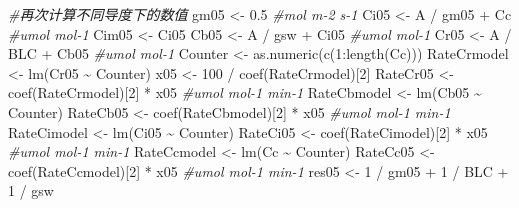 \documentclass[
]{krantz}
\makeatletter
\newenvironment{Shaded}{\begin{snugshade}}{\end{snugshade}}
\newcommand{\CommentTok}[1]{\textcolor[rgb]{0.56,0.35,0.01}{\textit{#1}}}
\newcommand{\DecValTok}[1]{\textcolor[rgb]{0.00,0.00,0.81}{#1}}
\newcommand{\FloatTok}[1]{\textcolor[rgb]{0.00,0.00,0.81}{#1}}
\newcommand{\FunctionTok}[1]{\textcolor[rgb]{0.00,0.00,0.00}{#1}}
\newcommand{\NormalTok}[1]{#1}
\newcommand{\OtherTok}[1]{\textcolor[rgb]{0.56,0.35,0.01}{#1}}
\newcommand{\SpecialCharTok}[1]{\textcolor[rgb]{0.00,0.00,0.00}{#1}}
\newenvironment{kframe}{%
\medskip{}
\setlength{\fboxsep}{.8em}
 \def\at@end@of@kframe{}%
 \ifinner\ifhmode%
  \def\at@end@of@kframe{\end{minipage}}%
  \begin{minipage}{\columnwidth}%
 \fi\fi%
 \def\FrameCommand##1{\hskip\@totalleftmargin \hskip-\fboxsep
 \colorbox{shadecolor}{##1}\hskip-\fboxsep
     \hskip-\linewidth \hskip-\@totalleftmargin \hskip\columnwidth}%
 \MakeFramed {\advance\hsize-\width
   \@totalleftmargin\z@ \linewidth\hsize
   \@setminipage}}%
 {\par\unskip\endMakeFramed%
 \at@end@of@kframe}
\renewenvironment{Shaded}{\begin{kframe}}{\end{kframe}}
\makeatother
\begin{document}
\begin{Shaded}
\begin{Highlighting}[]
\CommentTok{\#再次计算不同导度下的数值}
\NormalTok{gm05 }\OtherTok{\textless{}{-}} \FloatTok{0.5} \CommentTok{\#mol m{-}2 s{-}1}
\NormalTok{Ci05 }\OtherTok{\textless{}{-}}\NormalTok{ A }\SpecialCharTok{/}\NormalTok{ gm05 }\SpecialCharTok{+}\NormalTok{ Cc }\CommentTok{\#umol mol{-}1}
\NormalTok{Cim05 }\OtherTok{\textless{}{-}}\NormalTok{ Ci05}
\NormalTok{Cb05 }\OtherTok{\textless{}{-}}\NormalTok{ A }\SpecialCharTok{/}\NormalTok{ gsw }\SpecialCharTok{+}\NormalTok{ Ci05 }\CommentTok{\#umol mol{-}1}
\NormalTok{Cr05 }\OtherTok{\textless{}{-}}\NormalTok{ A }\SpecialCharTok{/}\NormalTok{ BLC }\SpecialCharTok{+}\NormalTok{ Cb05 }\CommentTok{\#umol mol{-}1}
\NormalTok{Counter }\OtherTok{\textless{}{-}} \FunctionTok{as.numeric}\NormalTok{(}\FunctionTok{c}\NormalTok{(}\DecValTok{1}\SpecialCharTok{:}\FunctionTok{length}\NormalTok{(Cc)))}
\NormalTok{RateCrmodel }\OtherTok{\textless{}{-}} \FunctionTok{lm}\NormalTok{(Cr05 }\SpecialCharTok{\textasciitilde{}}\NormalTok{ Counter)}
\NormalTok{x05 }\OtherTok{\textless{}{-}} \DecValTok{100} \SpecialCharTok{/} \FunctionTok{coef}\NormalTok{(RateCrmodel)[}\DecValTok{2}\NormalTok{]}
\NormalTok{RateCr05 }\OtherTok{\textless{}{-}} \FunctionTok{coef}\NormalTok{(RateCrmodel)[}\DecValTok{2}\NormalTok{] }\SpecialCharTok{*}\NormalTok{ x05 }\CommentTok{\#umol mol{-}1 min{-}1}
\NormalTok{RateCbmodel }\OtherTok{\textless{}{-}} \FunctionTok{lm}\NormalTok{(Cb05 }\SpecialCharTok{\textasciitilde{}}\NormalTok{ Counter)}
\NormalTok{RateCb05 }\OtherTok{\textless{}{-}} \FunctionTok{coef}\NormalTok{(RateCbmodel)[}\DecValTok{2}\NormalTok{] }\SpecialCharTok{*}\NormalTok{ x05 }\CommentTok{\#umol mol{-}1 min{-}1}
\NormalTok{RateCimodel }\OtherTok{\textless{}{-}} \FunctionTok{lm}\NormalTok{(Ci05 }\SpecialCharTok{\textasciitilde{}}\NormalTok{ Counter)}
\NormalTok{RateCi05 }\OtherTok{\textless{}{-}} \FunctionTok{coef}\NormalTok{(RateCimodel)[}\DecValTok{2}\NormalTok{] }\SpecialCharTok{*}\NormalTok{ x05 }\CommentTok{\#umol mol{-}1 min{-}1}
\NormalTok{RateCcmodel }\OtherTok{\textless{}{-}} \FunctionTok{lm}\NormalTok{(Cc }\SpecialCharTok{\textasciitilde{}}\NormalTok{ Counter)}
\NormalTok{RateCc05 }\OtherTok{\textless{}{-}} \FunctionTok{coef}\NormalTok{(RateCcmodel)[}\DecValTok{2}\NormalTok{] }\SpecialCharTok{*}\NormalTok{ x05 }\CommentTok{\#umol mol{-}1 min{-}1}
\NormalTok{res05 }\OtherTok{\textless{}{-}} \DecValTok{1} \SpecialCharTok{/}\NormalTok{ gm05 }\SpecialCharTok{+} \DecValTok{1} \SpecialCharTok{/}\NormalTok{ BLC }\SpecialCharTok{+} \DecValTok{1} \SpecialCharTok{/}\NormalTok{ gsw}


\end{Highlighting}
\end{Shaded}
\end{document}
